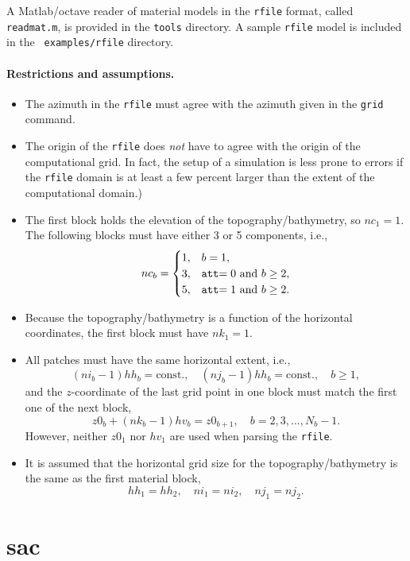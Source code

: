 \documentclass[11pt]{report}
\begin{document}
A Matlab/octave reader of material models in the {\tt rfile} format, called {\tt readmat.m}, is
provided in the {\tt tools} directory. A sample {\tt rfile} model is included in the {\tt
  examples/rfile} directory.

\paragraph{Restrictions and assumptions.}
\begin{itemize}
\item The azimuth in the {\tt rfile} must agree with the azimuth given in the {\tt grid} command.
\item The origin of the {\tt rfile} does {\em not} have to agree with the origin of the
  computational grid. In fact, the setup of a simulation is less prone to errors if the {\tt rfile}
  domain is at least a few percent larger than the extent of the computational domain.)

\item The first block holds the elevation of the topography/bathymetry, so $nc_1=1$. The following blocks
must have either 3 or 5 components, i.e.,
\[
nc_b=\begin{cases}
1,& b=1,\\
3,& \mbox{{\tt att}$=0$ and $b\geq 2$},\\
5,& \mbox{{\tt att}$=1$ and $b\geq 2$}.
\end{cases}
\]

\item Because the topography/bathymetry is a function of the horizontal coordinates, the first block must have
$nk_1=1$.

\item All patches must have the same horizontal extent, i.e.,
\[
(ni_b -1)hh_b = \mbox{const.},\quad (nj_b - 1)hh_b = \mbox{const.},\quad b\geq 1,
\]
and the $z$-coordinate of the last grid point in one block must match the first one of the next
block,
\[
z0_b+(nk_b-1)hv_b = z0_{b+1},\quad b=2,3,\ldots,N_b-1.
\]
However, neither $z0_1$ nor $hv_1$ are used when parsing the {\tt rfile}. 

\item It is assumed that the horizontal grid size for the topography/bathymetry is the same as the
  first material block,
\[
hh_1 = hh_2,\quad ni_1=ni_2,\quad nj_1=nj_2.
\]
\end{itemize}

\section{sac}\label{sec:sac-format}
\end{document}
